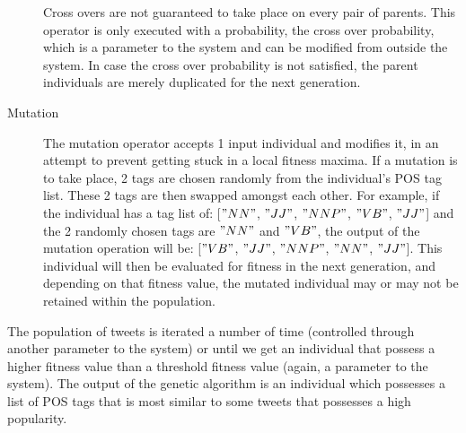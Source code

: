 \begin{description}
\linebreak
Cross overs are not guaranteed to take place on every pair of parents. This operator is only executed with a probability, the cross over probability, which is a parameter to the system and can be modified from outside the system. In case the cross over probability is not satisfied, the parent individuals are merely duplicated for the next generation.
\item[Mutation] The mutation operator accepts 1 input individual and modifies it, in an attempt to prevent getting stuck in a local fitness maxima. If a mutation is to take place, 2 tags are chosen randomly from the individual's POS tag list. These 2 tags are then swapped amongst each other. For example, if the individual has a tag list of: [$"NN"$, $"JJ"$, $"NNP"$, $"VB"$, $"JJ"$] and the 2 randomly chosen tags are $"NN"$ and $"VB"$, the output of the mutation operation will be: [$"VB"$, $"JJ"$, $"NNP"$, $"NN"$, $"JJ"$]. This individual will then be evaluated for fitness in the next generation, and depending on that fitness value, the mutated individual may or may not be retained within the population.
\end{description}
The population of tweets is iterated a number of time (controlled through another parameter to the system) or until we get an individual that possess a higher fitness value than a threshold fitness value (again, a parameter to the system). The output of the genetic algorithm is an individual which possesses a list of POS tags that is most similar to some tweets that possesses a high popularity.
